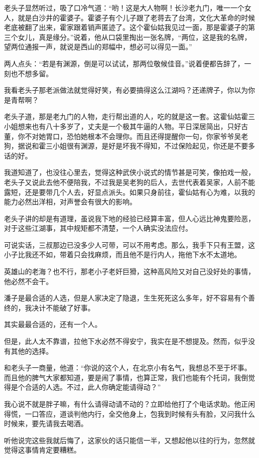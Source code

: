 老头子显然听过，吸了口冷气道：“哟！这是大人物啊！长沙老九门，唯一一个女人，就是白沙井的霍婆子。霍婆子有个儿子跟了老蒋去了台湾，文化大革命的时候老底被翻了出来，霍家跟着销声匿迹了。这个霍仙姑我见过一面，那是霍婆子的第三个女儿，真是缘分。”说着，他从口袋里掏出一张名牌，“两位，这是我的名牌，望两位通报一声，就说是西山的郑幅中，想必可以得见一面。”

两人点头：“若是有渊源，倒是可以试试，那两位敬候佳音。”说着便都告辞了，一刻也不想多留。

我看老头子那老派做法就觉得好笑，有必要搞得这么江湖吗？还递牌子，你以为你是青帮啊？

老头子道，那是老九门的人物，走行帮出道的人，吃的就是这一套。这霍仙姑霍三小姐想来也有八十多岁了，丈夫是一个极其牛逼的人物。平日深居简出，只好古董，你不对她胃口，恐怕她根本不会理你。而且还得提醒你一句，你家爷爷吴老狗，据说和霍三小姐很有渊源，是好是坏我不得知，不过保险起见，你还是不要多话的好。

我道知道了，也没往心里去，觉得这种武侠小说式的情节甚是可笑，像拍戏一般，老头子又说此去他不便陪我，不过我是吴老狗的后人，去世代表着吴家，人前不能露短，还是要带几个人去，好显点派头。如果只身前往，霍仙姑有心为难，以我的能力必然出洋相，对声誉会有很大的影响。

老头子讲的却是有道理，虽说我下地的经验已经算丰富，但人心远比神鬼要险恶，对于这些江湖事，其中规矩都不清楚，一个人确实没法应付。

可说实话，三叔那边已没多少人可带，可以不用考虑。那么，我手下只有王盟，这小子比我还不如，带着只会找麻烦，而且他不是行内人，拖他下水不太道地。

英雄山的老海？也不行，那老小子老奸巨猾，这种高风险又对自己没好处的事情，他必然不会干。

潘子是最合适的人选，但是人家决定了隐退，生生死死这么多年，好不容易有个善终的，我决计不能破了好事。

其实最最合适的，还有一个人。

但是，此人太不靠谱，拉他下水必然不得安宁，我实在是不想提及。然而，似乎没有其他的选择。

和老头子一商量，他道：“你说的这个人，在北京小有名气，我想总不至于坏事。而且他的脾气大家都知道，要是闹了事情，也算正常，我们也能有个托词，我倒觉得是个合适的人选。不过，此人你确定能请得动？”

我心说不就是胖子嘛，有什么请得动请不动的？立即给他打了个电话求助。他正闲得慌，一口答应，道谈判他内行，全交他身上，包我到时候有头有脸，又问我什么时候来，要先请我去喝酒。

听他说完这些我就后悔了，这家伙的话只能信一半，又想起他以往的行为，忽然就觉得这事情肯定要糟糕。

